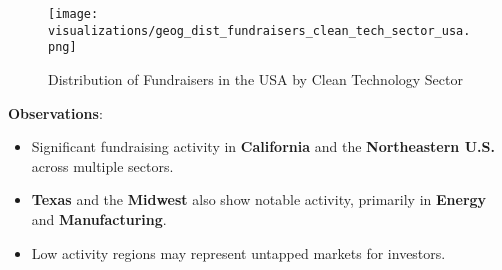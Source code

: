 \documentclass[sigconf]{acmart}
\begin{document}
\begin{figure*}[htpb]
    \centering
    \texttt{[image: visualizations/geog\_dist\_fundraisers\_clean\_tech\_sector\_usa.png]}
    \caption{Distribution of Fundraisers in the USA by Clean Technology Sector}
    \label{fig:usa_distribution}
\end{figure*}

\textbf{Observations}:

\begin{itemize}
    \item Significant fundraising activity in \textbf{California} and the \textbf{Northeastern U.S.} across multiple sectors.
    \item \textbf{Texas} and the \textbf{Midwest} also show notable activity, primarily in \textbf{Energy} and \textbf{Manufacturing}.
    \item Low activity regions may represent untapped markets for investors.
\end{itemize}
\end{document}
